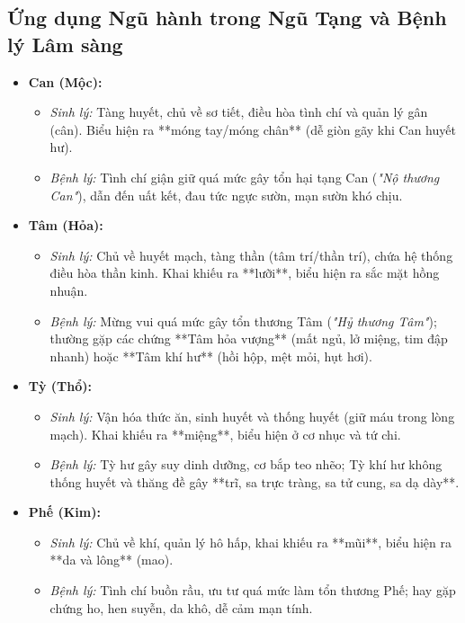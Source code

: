 \subsection{Ứng dụng Ngũ hành trong Ngũ Tạng và Bệnh lý Lâm sàng}

\begin{itemize}
    \item \textbf{Can (Mộc):}
    \begin{itemize}
        \item \textit{Sinh lý:} Tàng huyết, chủ về sơ tiết, điều hòa tình chí và quản lý gân (cân). Biểu hiện ra **móng tay/móng chân** (dễ giòn gãy khi Can huyết hư).
        \item \textit{Bệnh lý:} Tình chí giận giữ quá mức gây tổn hại tạng Can (\textit{"Nộ thương Can"}), dẫn đến uất kết, đau tức ngực sườn, mạn sườn khó chịu.
    \end{itemize}

    \item \textbf{Tâm (Hỏa):}
    \begin{itemize}
        \item \textit{Sinh lý:} Chủ về huyết mạch, tàng thần (tâm trí/thần trí), chứa hệ thống điều hòa thần kinh. Khai khiếu ra **lưỡi**, biểu hiện ra sắc mặt hồng nhuận.
        \item \textit{Bệnh lý:} Mừng vui quá mức gây tổn thương Tâm (\textit{"Hỷ thương Tâm"}); thường gặp các chứng **Tâm hỏa vượng** (mất ngủ, lở miệng, tim đập nhanh) hoặc **Tâm khí hư** (hồi hộp, mệt mỏi, hụt hơi).
    \end{itemize}

    \item \textbf{Tỳ (Thổ):}
    \begin{itemize}
        \item \textit{Sinh lý:} Vận hóa thức ăn, sinh huyết và thống huyết (giữ máu trong lòng mạch). Khai khiếu ra **miệng**, biểu hiện ở cơ nhục và tứ chi.
        \item \textit{Bệnh lý:} Tỳ hư gây suy dinh dưỡng, cơ bắp teo nhẽo; Tỳ khí hư không thống huyết và thăng đề gây **trĩ, sa trực tràng, sa tử cung, sa dạ dày**.
    \end{itemize}

    \item \textbf{Phế (Kim):}
    \begin{itemize}
        \item \textit{Sinh lý:} Chủ về khí, quản lý hô hấp, khai khiếu ra **mũi**, biểu hiện ra **da và lông** (mao).
        \item \textit{Bệnh lý:} Tình chí buồn rầu, ưu tư quá mức làm tổn thương Phế; hay gặp chứng ho, hen suyễn, da khô, dễ cảm mạn tính.
    \end{itemize}


\end{itemize}
